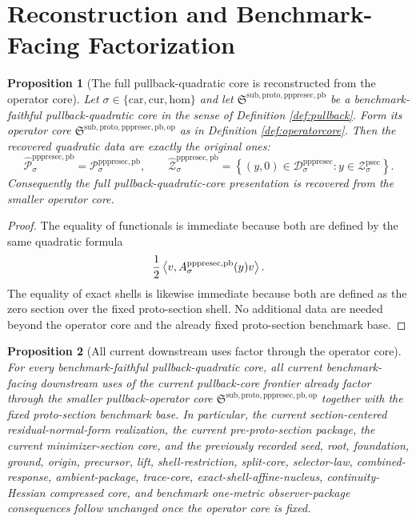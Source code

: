 \documentclass[11pt]{article}
\newcommand{\Car}{\mathrm{car}}
\newcommand{\Cur}{\mathrm{cur}}
\newcommand{\Hom}{\mathrm{hom}}
\newcommand{\ProtoSectionShell}[1]{\mathcal Z_{#1}^{\mathrm{psec}}}
\newcommand{\PrePreProtoSectionPullbackCore}{\mathfrak S^{\mathrm{sub,proto,pppresec,pb}}}
\newcommand{\PrePreProtoSectionResidualBody}[1]{\mathcal D_{#1}^{\mathrm{pppresec}}}
\newcommand{\PrePreProtoSectionPullbackOperator}[1]{A_{#1}^{\mathrm{pppresec,pb}}}
\newcommand{\PrePreProtoSectionPullbackFunctional}[1]{\mathscr P_{#1}^{\mathrm{pppresec,pb}}}
\newcommand{\PullbackOperatorCore}{\mathfrak S^{\mathrm{sub,proto,pppresec,pb,op}}}
\newcommand{\RecoveredPullbackFunctional}[1]{\widehat{\mathscr P}_{#1}^{\mathrm{pppresec,pb}}}
\newcommand{\RecoveredPullbackShell}[1]{\widehat{\mathcal Z}_{#1}^{\mathrm{pppresec,pb}}}
\newtheorem{proposition}{Proposition}
\begin{document}
\section{Reconstruction and Benchmark-Facing Factorization}

\begin{proposition}[The full pullback-quadratic core is reconstructed from the operator core]
\label{prop:reconstruct}
Let \(\sigma\in\{\Car,\Cur,\Hom\}\) and let \(\PrePreProtoSectionPullbackCore\) be a benchmark-faithful pullback-quadratic core in the sense of Definition \ref{def:pullback}. Form its operator core \(\PullbackOperatorCore\) as in Definition \ref{def:operatorcore}. Then the recovered quadratic data are exactly the original ones:
\[
\RecoveredPullbackFunctional{\sigma}
=
\PrePreProtoSectionPullbackFunctional{\sigma},
\qquad
\RecoveredPullbackShell{\sigma}
=
\left\{
(y,0)\in\PrePreProtoSectionResidualBody{\sigma}:y\in\ProtoSectionShell{\sigma}
\right\}.
\]
Consequently the full pullback-quadratic-core presentation is recovered from the smaller operator core.
\end{proposition}

\begin{proof}
The equality of functionals is immediate because both are defined by the same quadratic formula
\[
\frac{1}{2}\ev{v,\PrePreProtoSectionPullbackOperator{\sigma}(y)v}.
\]
The equality of exact shells is likewise immediate because both are defined as the zero section over the fixed proto-section shell. No additional data are needed beyond the operator core and the already fixed proto-section benchmark base.
\end{proof}

\begin{proposition}[All current downstream uses factor through the operator core]
\label{prop:downstream}
For every benchmark-faithful pullback-quadratic core, all current benchmark-facing downstream uses of the current pullback-core frontier already factor through the smaller pullback-operator core \(\PullbackOperatorCore\) together with the fixed proto-section benchmark base. In particular, the current section-centered residual-normal-form realization, the current pre-proto-section package, the current minimizer-section core, and the previously recorded seed, root, foundation, ground, origin, precursor, lift, shell-restriction, split-core, selector-law, combined-response, ambient-package, trace-core, exact-shell-affine-nucleus, continuity-Hessian compressed core, and benchmark one-metric observer-package consequences follow unchanged once the operator core is fixed.
\end{proposition}
\end{document}
